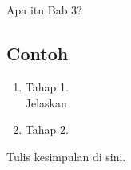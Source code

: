 \chapter{\babTiga}
Apa itu Bab 3?


\section{Contoh}
\begin{enumerate}
	\item Tahap 1. \\ %
	Jelaskan %

	\item Tahap 2.
\end{enumerate}

Tulis kesimpulan di sini.
